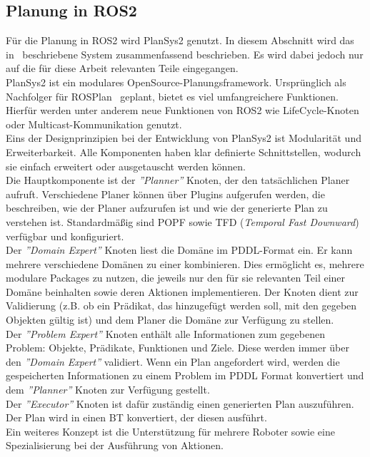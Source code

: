 \subsection{Planung in \ac{ROS2}}
Für die Planung in \ac{ROS2} wird \ac{PlanSys2} genutzt.
In diesem Abschnitt wird das in~\cite{plansys} beschriebene System zusammenfassend beschrieben.
Es wird dabei jedoch nur auf die für diese Arbeit relevanten Teile eingegangen.\\
\ac{PlanSys2} ist ein modulares OpenSource-Planungsframework.
Ursprünglich als Nachfolger für ROSPlan~\cite{rosplan} geplant, bietet es viel umfangreichere Funktionen.
Hierfür werden unter anderem neue Funktionen von \ac{ROS2} wie LifeCycle-Knoten oder Multicast-Kommunikation genutzt.\\
Eins der Designprinzipien bei der Entwicklung von \ac{PlanSys2} ist Modularität und Erweiterbarkeit.
Alle Komponenten haben klar definierte Schnittstellen, wodurch sie einfach erweitert oder ausgetauscht werden können.\\
Die Hauptkomponente ist der \emph{''Planner''} Knoten, der den tatsächlichen Planer aufruft.
Verschiedene Planer können über Plugins aufgerufen werden, die beschreiben, wie der Planer aufzurufen ist und wie der generierte Plan zu verstehen ist.
Standardmäßig sind \ac{POPF} sowie TFD (\emph{Temporal Fast Downward})~\cite{tfd} verfügbar und konfiguriert.\\
Der \emph{''Domain Expert''} Knoten liest die Domäne im \ac{PDDL}-Format ein.
Er kann mehrere verschiedene Domänen zu einer kombinieren.
Dies ermöglicht es, mehrere modulare Packages zu nutzen, die jeweils nur den für sie relevanten Teil einer Domäne beinhalten sowie deren Aktionen  implementieren.
Der Knoten dient zur Validierung (z.B. ob ein Prädikat, das hinzugefügt werden soll, mit den gegeben Objekten gültig ist) und dem Planer die Domäne zur Verfügung zu stellen.\\
Der \emph{''Problem Expert''} Knoten enthält alle Informationen zum gegebenen Problem: Objekte, Prädikate, Funktionen und Ziele.
Diese werden immer über den \emph{''Domain Expert''} validiert.
Wenn ein Plan angefordert wird, werden die gespeicherten Informationen zu einem Problem im \ac{PDDL} Format konvertiert und dem \emph{''Planner''} Knoten zur Verfügung gestellt.\\
Der \emph{''Executor''} Knoten ist dafür zuständig einen generierten Plan auszuführen.
Der Plan wird in einen \ac{BT} konvertiert, der diesen ausführt.\\
Ein weiteres Konzept ist die Unterstützung für mehrere Roboter sowie eine Spezialisierung bei der Ausführung von Aktionen.
